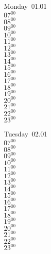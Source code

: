\documentclass[11pt, a4paper]{book}\usepackage[]{graphicx}\usepackage[]{color}
\begin{document}
\begin{headerbox}
\end{headerbox}
\begin{weekdaybox}
  Monday~01.01\\
  { 
  \vfill
  $07^{00}$\\
$08^{00}$\\
$09^{00}$\\
$10^{00}$\\
$11^{00}$\\
$12^{00}$\\
$13^{00}$\\
$14^{00}$\\
$15^{00}$\\
$16^{00}$\\
$17^{00}$\\
$18^{00}$\\
$19^{00}$\\
$20^{00}$\\
$21^{00}$\\
$22^{00}$\\
$23^{00}$\\
  }
\end{weekdaybox}
\begin{weekdaybox}
  Tuesday~02.01\\
  { 
  \vfill
  $07^{00}$\\
$08^{00}$\\
$09^{00}$\\
$10^{00}$\\
$11^{00}$\\
$12^{00}$\\
$13^{00}$\\
$14^{00}$\\
$15^{00}$\\
$16^{00}$\\
$17^{00}$\\
$18^{00}$\\
$19^{00}$\\
$20^{00}$\\
$21^{00}$\\
$22^{00}$\\
$23^{00}$\\
  }
\end{weekdaybox}
\end{document}
